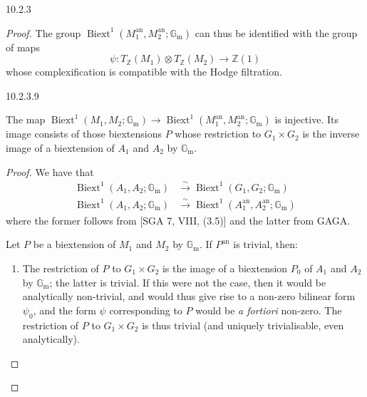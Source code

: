 \begin{construction}{10.2.3}
\begin{proof}
        The group \(\operatorname {Biext}^1(M_1^\mathrm {an},M_2^\mathrm {an};\mathbb {G}_\mathrm {m})\) can thus be identified with the group of maps
        \[           \psi \colon  T_\mathbb {Z}(M_1)\otimes  T_\mathbb {Z}(M_2)           \to  \mathbb {Z}(1)         \]
        whose complexification is compatible with the Hodge filtration.\begin{lemma}{10.2.3.9}\label{hodge-theory-iii-10.2.3.9}\skipsinglepar\par{}The map \(\operatorname {Biext}^1(M_1,M_2;\mathbb {G}_\mathrm {m})\to \operatorname {Biext}^1(M_1^\mathrm {an},M_2^\mathrm {an};\mathbb {G}_\mathrm {m})\) is injective.
        Its image consists of those biextensions \(P\) whose restriction to \(G_1\times  G_2\) is the inverse image of a biextension of \(A_1\) and \(A_2\) by \(\mathbb {G}_\mathrm {m}\).\begin{proof}\par{}We have that
          \[             \begin {aligned}               \operatorname {Biext}^1(A_1,A_2;\mathbb {G}_\mathrm {m})               &\xrightarrow {\sim } \operatorname {Biext}^1(G_1,G_2;\mathbb {G}_\mathrm {m})             \\\operatorname {Biext}^1(A_1,A_2;\mathbb {G}_\mathrm {m})               &\xrightarrow {\sim } \operatorname {Biext}^1(A_1^\mathrm {an},A_2^\mathrm {an};\mathbb {G}_\mathrm {m})             \end {aligned}           \]
          where the former follows from [SGA 7, VIII, (3.5)] and the latter from GAGA.\par{}Let \(P\) be a biextension of \(M_1\) and \(M_2\) by \(\mathbb {G}_\mathrm {m}\).
          If \(P^\mathrm {an}\) is trivial, then:

          
 \begin{enumerate}
            
 \item[(a)]
              The restriction of \(P\) to \(G_1\times  G_2\) is the image of a biextension \(P_0\) of \(A_1\) and \(A_2\) by \(\mathbb {G}_\mathrm {m}\);
              the latter is trivial.
              If this were not the case, then it would be analytically non-trivial, and would thus give rise to a non-zero bilinear form \(\psi _0\), and the form \(\psi \) corresponding to \(P\) would be \emph{a fortiori} non-zero.
              The restriction of \(P\) to \(G_1\times  G_2\) is thus trivial (and uniquely trivialisable, even analytically).
            



\end{enumerate}
\end{proof}
\end{lemma}
\end{proof}
\end{construction}
